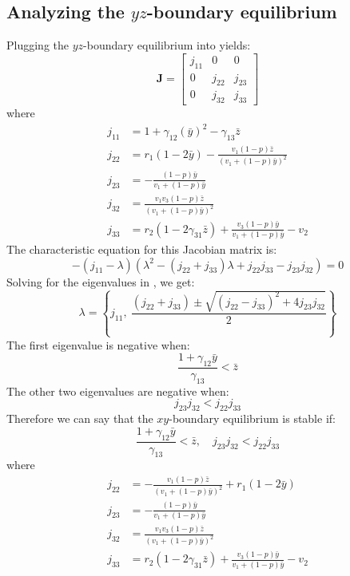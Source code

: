 \subsection{Analyzing the $yz$-boundary equilibrium}\label{subsec:stability_yz_boundary_equilibrium}
Plugging the $yz$-boundary equilibrium into  yields:
\begin{equation}
    \textbf{J}=\begin{bmatrix}
        j_{11} & 0 & 0\\
        0 & j_{22} & j_{23}\\
        0 & j_{32} & j_{33}
    \end{bmatrix}
    \label{eq:5.14}
\end{equation}
where
\begin{align*}
    j_{11} &= 1+\gamma_{12}\left(\bar{y}\right)^2-\gamma_{13}\bar{z}\\
    j_{22} &= r_1\left(1-2\bar{y}\right)-\frac{v_1\left(1-p\right)\bar{z}}{\left(v_1+\left(1-p\right)\bar{y}\right)^2}\\
    j_{23} &= -\frac{\left(1-p\right)\bar{y}}{v_1+\left(1-p\right)\bar{y}}\\
    j_{32} &= \frac{v_1v_3\left(1-p\right)\bar{z}}{\left(v_1+\left(1-p\right)\bar{y}\right)^2}\\
    j_{33} &= r_2\left(1-2\gamma_{31}\bar{z}\right)+\frac{v_3\left(1-p\right)\bar{y}}{v_1+\left(1-p\right)\bar{y}}-v_2
\end{align*}
The characteristic equation for this Jacobian matrix is:
\begin{equation}
    -\left(j_{11}-\lambda\right)\left(\lambda^2-\left(j_{22}+j_{33}\right)\lambda+j_{22}j_{33}-j_{23}j_{32}\right)=0
    \label{eq:5.15}
\end{equation}
Solving for the eigenvalues in , we get:
\[
\lambda=\left\{
j_{11},\ 
\frac{\left(j_{22}+j_{33}\right)\pm\sqrt{\left(j_{22}-j_{33}\right)^2+4j_{23}j_{32}}}{2}
\right\}
\]
The first eigenvalue is negative when:
\[
\frac{1+\gamma_{12}\bar{y}}{\gamma_{13}}<\bar{z}
\]
The other two eigenvalues are negative when:
\[
j_{23}j_{32}<j_{22}j_{33}
\]
Therefore we can say that the $xy$-boundary equilibrium is stable if:
\[
\frac{1+\gamma_{12}\bar{y}}{\gamma_{13}}<\bar{z},\quad 
j_{23}j_{32}<j_{22}j_{33}
\]
where
\begin{align*}
    j_{22} &= -\frac{v_1\left(1-p\right)\bar{z}}{\left(v_1+\left(1-p\right)\bar{y}\right)^2}+r_1\left(1-2\bar{y}\right)\\
    j_{23} &= -\frac{\left(1-p\right)\bar{y}}{v_1+\left(1-p\right)\bar{y}}\\
    j_{32} &= \frac{v_1v_3\left(1-p\right)\bar{z}}{\left(v_1+\left(1-p\right)\bar{y}\right)^2}\\
    j_{33} &= r_2\left(1-2\gamma_{31}\bar{z}\right)+\frac{v_3\left(1-p\right)\bar{y}}{v_1+\left(1-p\right)\bar{y}}-v_2
\end{align*}

